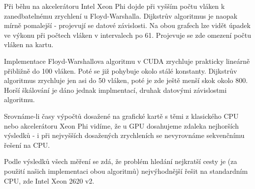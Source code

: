 \documentclass[10pt,a4paper]{article}
\begin{document}
Při běhu na akcelerátoru Intel Xeon Phi dojde při vyšším počtu vláken k zanedbatelnému zrychlení u Floyd-Warshalla. Dijkstrův algoritmus je naopak mírně pomalejší - projevují se datové závislosti.
Na obou grafech lze vidět úpadek ve výkonu při počtech vláken v intervalech po 61. Projevuje se zde omezení počtu vláken na kartu.

Implementace Floyd-Warshallova algoritmu v CUDA zrychluje prakticky lineárně přibližně do 100 vláken. Poté se již pohybuje okolo stálé konstanty. Dijkstrův algoritmus zrychluje jen asi do 50 vláken, poté je zde ještě menší skok okolo 800. Horší škálování je dáno jednak implmentací, druhak datovými závislostmi algoritmu.

Srovnáme-li časy výpočtů dosažené na grafické kartě s těmi z klasického CPU nebo akcelerátoru Xeon Phi vidíme, že u GPU dosahujeme zdaleka nejhorších výsledků - i při nejvyšších dosažených zrychleních se nevyrovnáme sekvenčnímu řešení na CPU.

Podle výsledků všech měření se zdá, že problém hledání nejkratší cesty je (za použití našich implementaci obou algoritmů)
nejvýhodnější řešit na standardním CPU, zde Intel Xeon 2620 v2. 

\newpage



\end{document}
